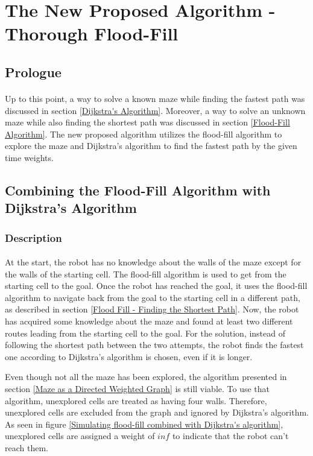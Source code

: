 \documentclass[12pt]{article}
\begin{document}
\section{The New Proposed Algorithm - Thorough Flood-Fill} \label{new-algorithm}
\subsection{Prologue}
\paragraph{}
Up to this point, a way to solve a known \gls{maze} while finding the fastest path was discussed in section \ref{Dijkstra's Algorithm}.
Moreover, a way to solve an unknown \gls{maze} while also finding the shortest path was discussed in section \ref{Flood-Fill Algorithm}.
The new proposed algorithm utilizes the flood-fill algorithm to explore the \gls{maze} and Dijkstra's algorithm to find the fastest path by the given time weights.

\subsection{Combining the Flood-Fill Algorithm with Dijkstra's Algorithm} \label{Combining Flood-Fill with Dijkstra's Algorithm}
\subsubsection{Description}
\paragraph{}
At the start, the robot has no knowledge about the walls of the \gls{maze} except for the walls of the starting \gls{cell}.
The flood-fill algorithm is used to get from the starting \gls{cell} to the goal.
Once the robot has reached the goal, it uses the flood-fill algorithm to navigate back from the goal to the starting \gls{cell} in a different path, as described in section \ref{Flood Fill - Finding the Shortest Path}.
Now, the robot has acquired some knowledge about the \gls{maze} and found at least two different routes leading from the starting \gls{cell} to the goal.
For the solution, instead of following the shortest path between the two attempts, the robot finds the fastest one according to Dijkstra's algorithm is chosen, even if it is longer.

Even though not all the \gls{maze} has been explored, the algorithm presented in section \ref{Maze as a Directed Weighted Graph} is still viable.
To use that algorithm, unexplored \gls{cell}s are treated as having four walls.
Therefore, unexplored \gls{cell}s are excluded from the \gls{graph} and ignored by Dijkstra's algorithm.
As seen in figure \ref{Simulating flood-fill combined with Dijkstra's algorithm}, unexplored \gls{cell}s are assigned a weight of $inf$ to indicate that the robot can't reach them.
\end{document}
